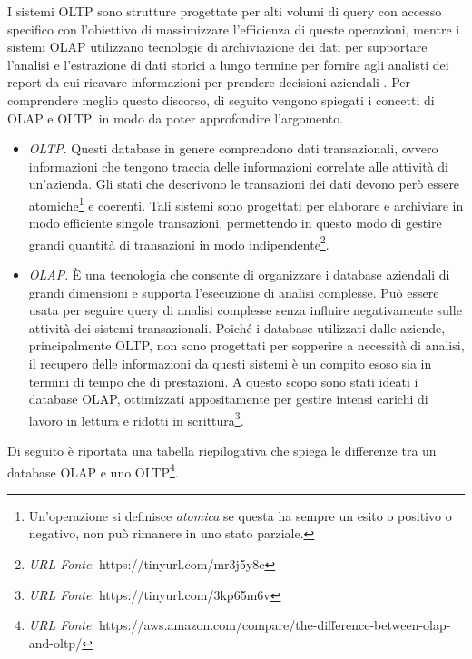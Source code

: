 I sistemi OLTP sono strutture progettate per alti volumi di query con accesso specifico con l'obiettivo di massimizzare l'efficienza di queste operazioni, mentre i sistemi OLAP utilizzano tecnologie di archiviazione dei dati per supportare l'analisi e l'estrazione di dati storici a lungo termine per fornire agli analisti dei report da cui ricavare informazioni per prendere decisioni aziendali \cite{ieee_oltp_olap}.
Per comprendere meglio questo discorso, di seguito vengono spiegati i concetti di OLAP e OLTP, in modo da poter approfondire l'argomento.

\begin{itemize}
    \item \textit{OLTP}. Questi database in genere comprendono dati transazionali, ovvero informazioni che tengono traccia delle informazioni correlate alle attività di un'azienda. Gli stati che descrivono le transazioni dei dati devono però essere atomiche\footnote{Un'operazione si definisce \textit{atomica} se questa ha sempre un esito o positivo o negativo, non può rimanere in uno stato parziale.} e coerenti. Tali sistemi sono progettati per elaborare e archiviare in modo efficiente singole transazioni, permettendo in questo modo di gestire grandi quantità di transazioni in modo indipendente\footnote{\textit{URL Fonte}: https://tinyurl.com/mr3j5y8c}.
    \item \textit{OLAP}. È una tecnologia che consente di organizzare i database aziendali di grandi dimensioni e supporta l'esecuzione di analisi complesse. Può essere usata per seguire query di analisi complesse senza influire negativamente sulle attività dei sistemi transazionali. Poiché i database utilizzati dalle aziende, principalmente OLTP, non sono progettati per sopperire a necessità di analisi, il recupero delle informazioni da questi sistemi è un compito esoso sia in termini di tempo che di prestazioni. A questo scopo sono stati ideati i database OLAP, ottimizzati appositamente per gestire intensi carichi di lavoro in lettura e ridotti in scrittura\footnote{\textit{URL Fonte}: https://tinyurl.com/3kp65m6v}.
\end{itemize}

Di seguito è riportata una tabella riepilogativa che spiega le differenze tra un database OLAP e uno OLTP\footnote{\textit{URL Fonte}: https://aws.amazon.com/compare/the-difference-between-olap-and-oltp/}.

